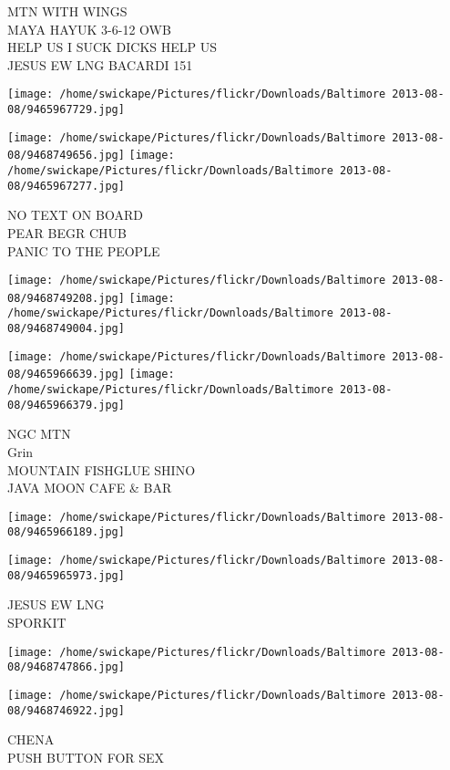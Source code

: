 \documentclass[10pt,letterpaper]{article}
\begin{document}
MTN WITH WINGS\\
MAYA HAYUK 3{-}6{-}12 OWB\\
HELP US I SUCK DICKS HELP US\\
JESUS EW LNG BACARDI 151
\pagebreak

\texttt{[image: /home/swickape/Pictures/flickr/Downloads/Baltimore 2013-08-08/9465967729.jpg]}

\vspace{0.25in}
\texttt{[image: /home/swickape/Pictures/flickr/Downloads/Baltimore 2013-08-08/9468749656.jpg]}
\texttt{[image: /home/swickape/Pictures/flickr/Downloads/Baltimore 2013-08-08/9465967277.jpg]}

NO TEXT ON BOARD\\
PEAR BEGR CHUB\\
PANIC TO THE PEOPLE
\pagebreak

\texttt{[image: /home/swickape/Pictures/flickr/Downloads/Baltimore 2013-08-08/9468749208.jpg]}
\texttt{[image: /home/swickape/Pictures/flickr/Downloads/Baltimore 2013-08-08/9468749004.jpg]}

\texttt{[image: /home/swickape/Pictures/flickr/Downloads/Baltimore 2013-08-08/9465966639.jpg]}
\texttt{[image: /home/swickape/Pictures/flickr/Downloads/Baltimore 2013-08-08/9465966379.jpg]}

NGC MTN\\
Grin\\
MOUNTAIN FISHGLUE SHINO\\
JAVA MOON CAFE \& BAR
\pagebreak

\texttt{[image: /home/swickape/Pictures/flickr/Downloads/Baltimore 2013-08-08/9465966189.jpg]}

\vspace{0.25in}
\texttt{[image: /home/swickape/Pictures/flickr/Downloads/Baltimore 2013-08-08/9465965973.jpg]}

JESUS EW LNG\\
SPORKIT
\pagebreak

\texttt{[image: /home/swickape/Pictures/flickr/Downloads/Baltimore 2013-08-08/9468747866.jpg]}

\vspace{0.25in}
\texttt{[image: /home/swickape/Pictures/flickr/Downloads/Baltimore 2013-08-08/9468746922.jpg]}

CHENA\\
PUSH BUTTON FOR SEX
\pagebreak
\end{document}
